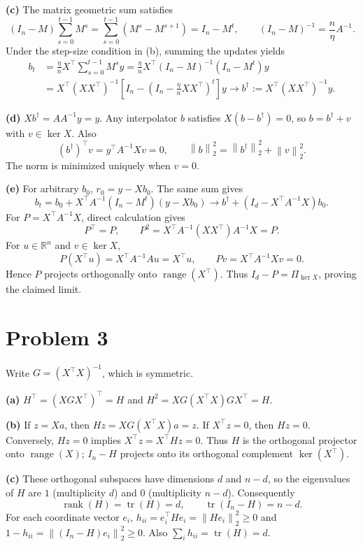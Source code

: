 \documentclass[11pt]{article}
\newcommand{\norm}[1]{\left\lVert#1\right\rVert}
\begin{document}
\textbf{(c)} The matrix geometric sum satisfies
\[
 (I_n-M)\sum_{s=0}^{t-1}M^s
 =\sum_{s=0}^{t-1}(M^s-M^{s+1})=I_n-M^t,
 \qquad (I_n-M)^{-1}=\frac n\eta A^{-1}.
\]
Under the step-size condition in (b), summing the updates yields
\begin{align*}
 b_t&=\frac\eta n X^\top\sum_{s=0}^{t-1}M^s y
 =\frac\eta n X^\top(I_n-M)^{-1}(I_n-M^t)y\\
 &=X^\top(XX^\top)^{-1}
 \left[I_n-\left(I_n-\frac\eta nXX^\top\right)^t\right]y
 \longrightarrow b^\dagger:=X^\top(XX^\top)^{-1}y.
\end{align*}

\textbf{(d)} $Xb^\dagger=AA^{-1}y=y$. Any interpolator $b$ satisfies
$X(b-b^\dagger)=0$, so $b=b^\dagger+v$ with $v\in\ker X$.
Also
\[
 (b^\dagger)^\top v=y^\top A^{-1}Xv=0,
 \qquad \norm b_2^2=\norm{b^\dagger}_2^2+\norm v_2^2.
\]
The norm is minimized uniquely when $v=0$.

\textbf{(e)} For arbitrary $b_0$, $r_0=y-Xb_0$. The same sum gives
\[
 b_t=b_0+X^\top A^{-1}(I_n-M^t)(y-Xb_0)
 \longrightarrow b^\dagger+(I_d-X^\top A^{-1}X)b_0.
\]
For $P=X^\top A^{-1}X$, direct calculation gives
\[
 P^\top=P,\qquad
 P^2=X^\top A^{-1}(XX^\top)A^{-1}X=P.
\]
For $u\in\mathbb R^n$ and $v\in\ker X$,
\[
 P(X^\top u)=X^\top A^{-1}Au=X^\top u,
 \qquad Pv=X^\top A^{-1}Xv=0.
\]
Hence $P$ projects orthogonally onto $\operatorname{range}(X^\top)$.
Thus $I_d-P=\Pi_{\ker X}$, proving the claimed limit.

\section*{Problem 3}
Write $G=(X^\top X)^{-1}$, which is symmetric.

\textbf{(a)} $H^\top=(XGX^\top)^\top=H$ and
$H^2=XG(X^\top X)GX^\top=H$.

\textbf{(b)} If $z=Xa$, then $Hz=XG(X^\top X)a=z$.
If $X^\top z=0$, then $Hz=0$. Conversely, $Hz=0$ implies
$X^\top z=X^\top Hz=0$.
Thus $H$ is the orthogonal projector onto $\operatorname{range}(X)$;
$I_n-H$ projects onto its orthogonal complement $\ker(X^\top)$.

\textbf{(c)} These orthogonal subspaces have dimensions $d$ and $n-d$,
so the eigenvalues of $H$ are $1$ (multiplicity $d$) and $0$
(multiplicity $n-d$). Consequently
\[
 \operatorname{rank}(H)=\operatorname{tr}(H)=d,\qquad
 \operatorname{tr}(I_n-H)=n-d.
\]
For each coordinate vector $e_i$,
$h_{ii}=e_i^\top H e_i=\norm{He_i}_2^2\geq0$ and
$1-h_{ii}=\norm{(I_n-H)e_i}_2^2\geq0$.
Also $\sum_i h_{ii}=\operatorname{tr}(H)=d$.
\end{document}

